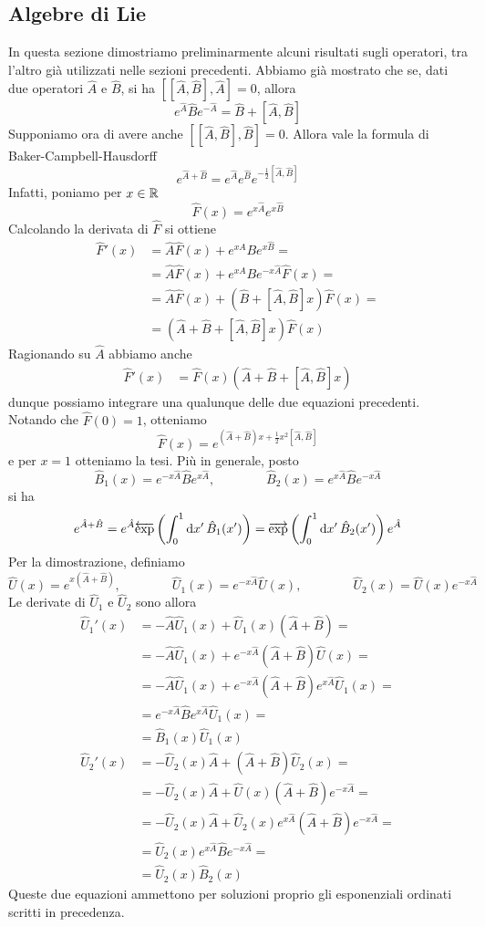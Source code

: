 \documentclass[a4paper, 11pt]{article}
\newcommand{\op}[1]{\hat{#1}}
\renewcommand{\op}[1]{\hat{#1}}
\begin{document}
\subsection{Algebre di Lie}
In questa sezione dimostriamo preliminarmente alcuni risultati sugli operatori, tra l'altro già utilizzati nelle sezioni precedenti. Abbiamo già mostrato che se, dati due operatori $\op{A}$ e $\op{B}$, si ha $[[\op{A},\op{B}],\op{A}]=0$, allora
\[e^{\op{A}}\op{B}e^{-\op{A}}=\op{B}+[\op{A},\op{B}]\]
Supponiamo ora di avere anche $[[\op A,\op B],\op B]=0$. Allora vale la formula di Baker-Campbell-Hausdorff
\[e^{\op A+\op B}=e^{\op A}e^{\op B}e^{-\frac{1}{2}[\op A,\op B]}\]
Infatti, poniamo per $x\in \mathbb{R}$
\[\op F(x)=e^{x\op A}e^{x\op B}\]
Calcolando la derivata di $\op F$ si ottiene
\begin{align*}
	\op F'(x)&=\op A\op F(x)+e^{x\op A}Be^{x\op B}=\\&=\op A\op F(x)+e^{x\op A}Be^{-x\op A}\op F(x)=\\&=\op A\op F(x)+\left(\op B+[\op A,\op B]x\right)\op F(x)=\\&=\left(\op A+\op B+[\op A,\op B]x\right)\op F(x)
\end{align*}
Ragionando su $\op A$ abbiamo anche
\begin{align*}
	\op F'(x)&=\op F(x)\left(\op A+\op B+[\op A,\op B]x\right)
\end{align*}
dunque possiamo integrare una qualunque delle due equazioni precedenti. Notando che $\op F(0)=1$, otteniamo
\[\op F(x)=e^{(\op A+\op B)x+\frac{1}{2}x^2[\op A,\op B]}\]
e per $x=1$ otteniamo la tesi. Più in generale, posto
\[\op B_1(x)= e^{-x\op A}\op B e^{x\op A},\qquad\qquad\op B_2(x)=e^{x\op A}\op Be^{-x\op A}\]
si ha
\[e^{\op A+\op B}=e^{\op A}\overleftarrow{\exp}\left(\int_{0}^1\d x'\,\op B_1(x')\right)=\overrightarrow{\exp}\left(\int_{0}^1\d x'\,\op B_2(x')\right)e^{\op A}\]
Per la dimostrazione, definiamo
\[\op U(x)=e^{x(\op A+\op B)},\qquad\qquad\op{U}_1(x)=e^{-x\op A}\op U(x),\qquad\qquad\op U_2(x)=\op U(x)e^{-x\op A}\]
Le derivate di $\op U_1$ e $\op U_2$ sono allora
\begin{align*}
	\op U_1'(x)&=-\op A\op U_1(x)+\op U_1(x)(\op A+\op B)=\\&=-\op A\op U_1(x)+e^{-x\op A}(\op A+\op B)\op U(x)=\\&=-\op A\op U_1(x)+e^{-x\op A}(\op A+\op B)e^{x\op A}\op U_1(x)=\\&=e^{-x\op A}\op Be^{x\op A}\op U_1(x)=\\&=\op B_1(x)\op U_1(x)\\\op U_2'(x)&=-\op U_2(x)\op A+(\op A+\op B)\op U_2(x)=\\&=-\op U_2(x)\op A+\op U(x)(\op A+\op B)e^{-x\op A}=\\&=-\op U_2(x)\op A+\op U_2(x)e^{x\op A}(\op A+\op B)e^{-x\op A}=\\&=\op U_2(x)e^{x\op A}\op Be^{-x\op A}=\\&=\op U_2(x)\op B_2(x)
\end{align*}
Queste due equazioni ammettono per soluzioni proprio gli esponenziali ordinati scritti in precedenza.
\end{document}
